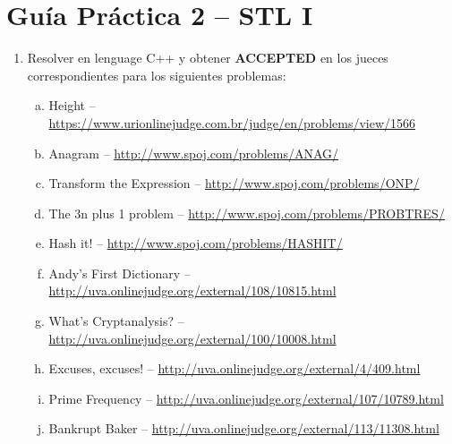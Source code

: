 




\section*{Gu\'ia Pr\'actica 2 -- STL I}

\begin{enumerate}[1 -]
	
	\item Resolver en lenguage C++ y obtener \textbf{ACCEPTED} en los jueces correspondientes para los siguientes problemas:
	
	\begin{enumerate}[a)]
		
		\item Height -- \href{https://www.urionlinejudge.com.br/judge/en/problems/view/1566}{https://www.urionlinejudge.com.br/judge/en/problems/view/1566	}	
		\item Anagram -- \href{http://www.spoj.com/problems/ANAG/}{http://www.spoj.com/problems/ANAG/}
		\item Transform the Expression -- \href{http://www.spoj.com/problems/ONP/}{http://www.spoj.com/problems/ONP/}
        \item The 3n plus 1 problem -- \href{http://www.spoj.com/problems/PROBTRES/}{http://www.spoj.com/problems/PROBTRES/}
		\item Hash it! -- \href{http://www.spoj.com/problems/HASHIT/}{http://www.spoj.com/problems/HASHIT/}
		\item Andy’s First Dictionary -- \href{http://uva.onlinejudge.org/external/108/10815.html}{http://uva.onlinejudge.org/external/108/10815.html}
		\item What's Cryptanalysis? -- \href{http://uva.onlinejudge.org/external/100/10008.html}{http://uva.onlinejudge.org/external/100/10008.html}
		\item Excuses, excuses! -- \href{http://uva.onlinejudge.org/external/4/409.html}{http://uva.onlinejudge.org/external/4/409.html}
		\item Prime Frequency -- \href{http://uva.onlinejudge.org/external/107/10789.html}{http://uva.onlinejudge.org/external/107/10789.html}
		\item Bankrupt Baker -- \href{http://uva.onlinejudge.org/external/113/11308.html}{http://uva.onlinejudge.org/external/113/11308.html}
	\end{enumerate}

\end{enumerate}






